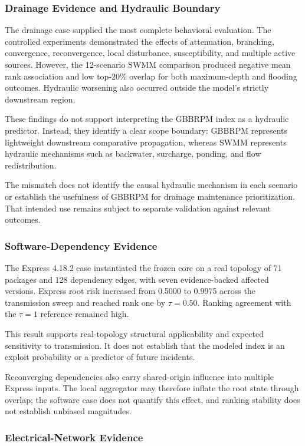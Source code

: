 \subsubsection{Drainage Evidence and Hydraulic Boundary}

The drainage case supplied the most complete behavioral evaluation. The
controlled experiments demonstrated the effects of attenuation,
branching, convergence, reconvergence, local disturbance, susceptibility,
and multiple active sources. However, the 12-scenario SWMM comparison
produced negative mean rank association and low top-20\% overlap for
both maximum-depth and flooding outcomes. Hydraulic worsening also
occurred outside the model's strictly downstream region.

These findings do not support interpreting the GBBRPM index as a
hydraulic predictor. Instead, they identify a clear scope boundary:
GBBRPM represents lightweight downstream comparative propagation,
whereas SWMM represents hydraulic mechanisms such as backwater,
surcharge, ponding, and flow redistribution.

The mismatch does not identify the causal hydraulic mechanism in each
scenario or establish the usefulness of GBBRPM for drainage maintenance
prioritization. That intended use remains subject to separate validation
against relevant outcomes.

\subsubsection{Software-Dependency Evidence}

The Express 4.18.2 case instantiated the frozen core on a real topology
of 71 packages and 128 dependency edges, with seven evidence-backed
affected versions. Express root risk increased from 0.5000 to 0.9975
across the transmission sweep and reached rank one by $\tau=0.50$.
Ranking agreement with the $\tau=1$ reference remained high.

This result supports real-topology structural applicability and expected
sensitivity to transmission. It does not establish that the modeled
index is an exploit probability or a predictor of future incidents.

Reconverging dependencies also carry shared-origin influence into
multiple Express inputs. The local aggregator may therefore inflate the
root state through overlap; the software case does not quantify this
effect, and ranking stability does not establish unbiased magnitudes.

\subsubsection{Electrical-Network Evidence}

